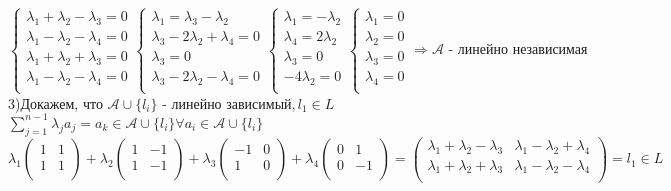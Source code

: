 \documentclass{article}
\begin{document}
    \[
    \begin{cases}
        \lambda_1 + \lambda_2 - \lambda_3 = 0 \\
        \lambda_1 - \lambda_2 - \lambda_4 = 0 \\
        \lambda_1 + \lambda_2 + \lambda_3 = 0 \\
        \lambda_1 - \lambda_2 - \lambda_4 = 0 \\
    \end{cases}
    \begin{cases}
        \lambda_1 = \lambda_3 - \lambda_2 \\
        \lambda_3 - 2\lambda_2 + \lambda_4 = 0 \\
        \lambda_3 = 0 \\
        \lambda_3 - 2\lambda_2 - \lambda_4 = 0 \\
    \end{cases}
    \begin{cases}
        \lambda_1 = - \lambda_2 \\
        \lambda_4 = 2\lambda_2 \\
        \lambda_3 = 0 \\
        -4\lambda_2 = 0 \\
    \end{cases}
    \begin{cases}
        \lambda_1 = 0 \\
        \lambda_2 = 0 \\
        \lambda_3 = 0 \\
        \lambda_4 = 0 \\
    \end{cases} \Rightarrow \mathcal{A} \text{ - линейно независимая}
    \]
    3)Докажем, что $\mathcal{A} \cup \{l_i\} \text{ - линейно зависимый}, l_1 \in L$ \iff \exists $\sum\limits_{j=1}^{n-1} \lambda_j a_j = a_k \in \mathcal{A} \cup \{l_i\} \forall a_i \in \mathcal{A} \cup \{l_i\}$ \\
    \[
    \lambda_1
    \begin{pmatrix}
        1 & 1 \\
        1 & 1 \\
    \end{pmatrix}
    + \lambda_2
    \begin{pmatrix}
        1 & -1 \\
        1 & -1 \\
    \end{pmatrix}
    + \lambda_3
    \begin{pmatrix}
        -1 & 0 \\
        1 & 0 \\
    \end{pmatrix}
    + \lambda_4
    \begin{pmatrix}
        0 & 1 \\
        0 & -1 \\
    \end{pmatrix}
    =
    \begin{pmatrix}
        \lambda_1 + \lambda_2 - \lambda_3 & \lambda_1 - \lambda_2 + \lambda_4 \\
        \lambda_1 + \lambda_2 + \lambda_3 & \lambda_1 - \lambda_2 - \lambda_4 \\
    \end{pmatrix}
    = l_1 \in L
    \]
\end{document}
